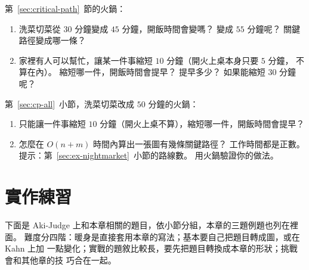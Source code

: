 \begin{drills}[label=drills:ch6]
\item 第~\ref{sec:critical-path}~節的火鍋：
\begin{enumerate}
\item 洗菜切菜從 $30$ 分鐘變成 $45$ 分鐘，開飯時間會變嗎？ 變成 $55$ 分鐘呢？
關鍵路徑變成哪一條？
\item 家裡有人可以幫忙，讓某一件事縮短 $10$ 分鐘（開火上桌本身只要 $5$ 分鐘，
不算在內）。 縮短哪一件，開飯時間會提早？ 提早多少？ 如果能縮短 $30$ 分鐘呢？
\end{enumerate}

\item 第~\ref{sec:cp-all}~小節，洗菜切菜改成 $50$ 分鐘的火鍋：
\begin{enumerate}
\item 只能讓一件事縮短 $10$ 分鐘（開火上桌不算），縮短哪一件，開飯時間會提早？
\item 怎麼在 $O(n + m)$ 時間內算出一張圖有幾條關鍵路徑？ 工作時間都是正數。
提示：第~\ref{sec:ex-nightmarket}~小節的路線數。 用火鍋驗證你的做法。
\end{enumerate}
\end{drills}

\section{實作練習}
\label{sec:ch6-practice}

下面是 Aki-Judge 上和本章相關的題目，依小節分組，本章的三題例題也列在裡面。
難度分四階：暖身是直接套用本章的寫法；基本要自己把題目轉成圖，或在 Kahn 上加
一點變化；實戰的題敘比較長，要先把題目轉換成本章的形狀；挑戰會和其他章的技
巧合在一起。

